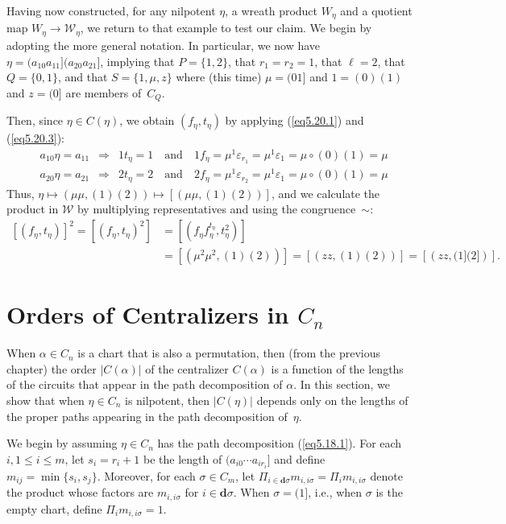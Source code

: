 \documentclass{surv-l}
\numberwithin{equation}{section}
\numberwithin{table}{section}
\numberwithin{figure}{section}
\theoremstyle{definition}
\begin{document}
Having now constructed, for any nilpotent $\eta$, a wreath product
$W_{\eta}$ and a quotient map $W_{\eta}\rightarrow
\mathcal{W}_{\eta}$, we return to that example to test our claim.
We begin by adopting the more general notation. In particular, we
now have $\eta=(a_{10}a_{11}](a_{20}a_{21}]$, implying that
$P=\{1,2\}$, that $r_{1}=r_{2}=1$, that $\ell=2$, that
$Q=\{0,1\}$, and that $S=\{1, \mu, z\}$ where (this time)
$\mu=(01]$ and $1=(0)(1)$ and $z=(0]$ are members of~$C_{Q}$.

Then, since $\eta\in C(\eta)$, we obtain $(f_{\eta}, t_{\eta})$ by
applying (\ref{eq5.20.1}) and (\ref{eq5.20.3}):
\begin{align*}
&a_{10}\eta=a_{11}\enspace \Rightarrow\enspace 1t_{\eta}=1\quad \mathrm{and}\quad 1 f_{\eta}=\mu^{1}\varepsilon_{r_{1}}=\mu^{1}\varepsilon_{1}=\mu\circ(0)(1)=\mu \\
&a_{20}\eta=a_{21}\enspace \Rightarrow\enspace 2t_{\eta}=2\quad \mathrm{and}\quad 2 f_{\eta}=\mu^{1}\varepsilon_{r_{2}}=\mu^{1}\varepsilon_{1}=\mu\circ(0)(1)=\mu
\end{align*}
Thus, $\eta\mapsto \left(\mu\mu,
(1)(2)\right)\mapsto\left[\left(\mu\mu,(1)(2)\right)\right]$, and
we calculate the product in $\mathcal{W}$ by multiplying
representatives and using the congruence~$\sim$:
\begin{align*}
\left[(f_{\eta}, t_{\eta})\right]^{2}=\left[(f_{\eta},
t_{\eta})^{2}\right]&=\left[(f_{\eta}f_{\eta}^{t_{\eta}}, t_{\eta}^{2})\right] \\
&=\left[(\mu^{2}\mu^{2}, (1)(2))\right] =\left[\left(zz, (1)(2)\right)\right]=\left[\left(zz, (1](2]\right)\right].
\end{align*}

\section{Orders of Centralizers in $C_{n}$}\label{sec5.22}

When $\alpha\in C_{n}$ is a chart that is also a permutation, then
(from the previous chapter) the order $|C(\alpha)|$ of the
centralizer $C(\alpha)$ is a
function of the lengths of the circuits that appear in the path
decomposition of $\alpha$. In this section, we show that when
$\eta\in C_{n}$ is nilpotent, then $|C(\eta)|$ depends only on the
lengths of the proper paths appearing in the path decomposition
of~$\eta$.

We begin by assuming $\eta\in C_{n}$ has the path decomposition
(\ref{eq5.18.1}). For each $i, 1\leq i\leq m$, let $s_{i}=r_{i}+1$
be the length of $(a_{i0}\cdots a_{ir_{i}}]$ and define
$m_{ij}=\min\{s_{i}, s_{j}\}$. Moreover, for each $\sigma\in
C_{m}$, let $\Pi_{i\in
\mathbf{d}\sigma}m_{i,i\sigma}=\Pi_{i}m_{i,i\sigma}$ denote the
product whose factors are $m_{i,i\sigma}$ for $ i\in
\mathbf{d}\sigma$. When $\sigma=(1]$, i.e., when $\sigma$ is the
empty chart, define $\Pi_{i}m_{i,i\sigma}=1$.
\end{document}

